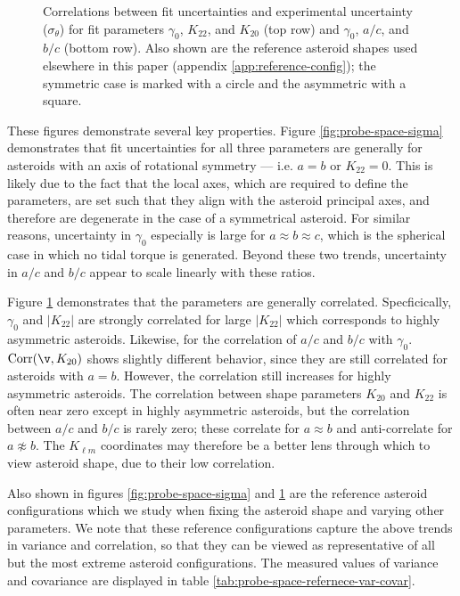 \documentclass{aastex631}
\begin{document}
\begin{figure}
  \caption{Correlations between fit uncertainties and experimental uncertainty ($\sigma_\theta$) for fit parameters $\gamma_0$, $K_{22}$, and $K_{20}$ (top row) and $\gamma_0$, $a/c$, and $b/c$ (bottom row). Also shown are the reference asteroid shapes used elsewhere in this paper (appendix \ref{app:reference-config}); the symmetric case is marked with a circle and the asymmetric with a square.}
  \label{fig:probe-space-corr}
\end{figure}

These figures demonstrate several key properties. Figure \ref{fig:probe-space-sigma} demonstrates that fit uncertainties for all three parameters are generally for asteroids with an axis of rotational symmetry --- i.e. $a=b$ or $K_{22} = 0$. This is likely due to the fact that the local axes, which are required to define the parameters, are set such that they align with the asteroid principal axes, and therefore are degenerate in the case of a symmetrical asteroid. For similar reasons, uncertainty in $\gamma_0$ especially is large for $a \approx b \approx c$, which is the spherical case in which no tidal torque is generated. Beyond these two trends, uncertainty in $a/c$ and $b/c$ appear to scale linearly with these ratios. 

Figure \ref{fig:probe-space-corr} demonstrates that the parameters are generally correlated. Specficically, $\gamma_0$ and $|K_{22}|$ are strongly correlated for large $|K_{22}|$ which corresponds to highly asymmetric asteroids. Likewise, for the correlation of $a/c$ and $b/c$ with $\gamma_0$. $\mathrm{Corr}(\v, K_{20})$ shows slightly different behavior, since they are still correlated for asteroids with $a=b$. However, the correlation still increases for highly asymmetric asteroids. The correlation between shape parameters $K_{20}$ and $K_{22}$ is often near zero except in highly asymmetric asteroids, but the correlation between $a/c$ and $b/c$ is rarely zero; these correlate for $a\approx b$ and anti-correlate for $a \not \approx b$. The $K_{\ell m}$ coordinates may therefore be a better lens through which to view asteroid shape, due to their low correlation.

Also shown in figures \ref{fig:probe-space-sigma} and \ref{fig:probe-space-corr} are the reference asteroid configurations which we study when fixing the asteroid shape and varying other parameters. We note that these reference configurations capture the above trends in variance and correlation, so that they can be viewed as representative of all but the most extreme asteroid configurations. The measured values of variance and covariance are displayed in table \ref{tab:probe-space-refernece-var-covar}.
\end{document}
